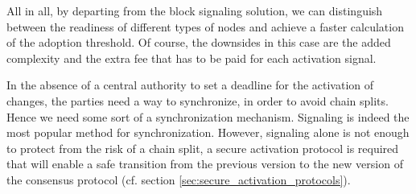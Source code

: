 All in all, by departing from the block signaling solution, we can distinguish
between the readiness of different types of nodes and achieve a faster
calculation of the adoption threshold. Of course, the downsides in this case are
the added complexity and the extra fee that has to be paid for each activation
signal.

In the absence of a central authority to set a deadline for the activation of
changes, the parties need a way to synchronize, in order to avoid chain splits.
Hence we need some sort of a synchronization mechanism. Signaling is indeed the
most popular method for synchronization. However, signaling alone is not enough
to protect from the risk of a chain split, a secure activation protocol is
required that will enable a safe transition from  the previous version to the
new
version of the consensus protocol (cf. section
\ref{sec:secure_activation_protocols}).


